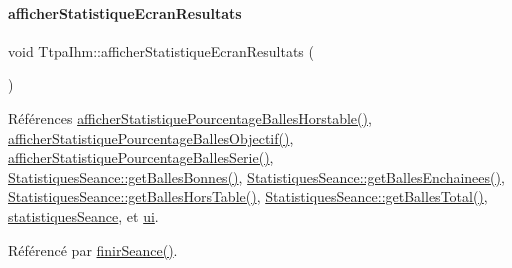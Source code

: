 \paragraph{\texorpdfstring{afficher\+Statistique\+Ecran\+Resultats}{afficherStatistiqueEcranResultats}}
{\footnotesize\ttfamily void Ttpa\+Ihm\+::afficher\+Statistique\+Ecran\+Resultats (\begin{DoxyParamCaption}{ }\end{DoxyParamCaption})\hspace{0.3cm}{\ttfamily [slot]}}



Références \hyperlink{class_ttpa_ihm_a58058063eb377b4c4c48048e4bf84e77}{afficher\+Statistique\+Pourcentage\+Balles\+Horstable()}, \hyperlink{class_ttpa_ihm_ac37d57d13301cda22f062219de8731c4}{afficher\+Statistique\+Pourcentage\+Balles\+Objectif()}, \hyperlink{class_ttpa_ihm_aec988dc2398578eb8e91563d1ba58cde}{afficher\+Statistique\+Pourcentage\+Balles\+Serie()}, \hyperlink{class_statistiques_seance_a0dad2ceb22672adf343548b35bf86ba1}{Statistiques\+Seance\+::get\+Balles\+Bonnes()}, \hyperlink{class_statistiques_seance_a1f241d7ef584ebffa2246134c63be53b}{Statistiques\+Seance\+::get\+Balles\+Enchainees()}, \hyperlink{class_statistiques_seance_a26b717d40065e7afd80465458f3cb6aa}{Statistiques\+Seance\+::get\+Balles\+Hors\+Table()}, \hyperlink{class_statistiques_seance_aaefd0b775012ec914a36a262dc14fc66}{Statistiques\+Seance\+::get\+Balles\+Total()}, \hyperlink{class_ttpa_ihm_abed6897d6f7b4d3a5eb8dcc07651e740}{statistiques\+Seance}, et \hyperlink{class_ttpa_ihm_ad5fae1222a667da158c26f3d0f0dce23}{ui}.



Référencé par \hyperlink{class_ttpa_ihm_aec3a96864aaa87f245bdafbf7a076a94}{finir\+Seance()}.


